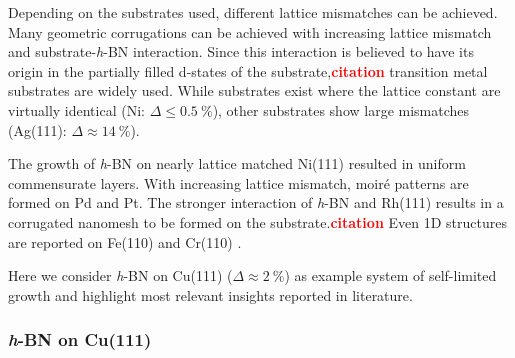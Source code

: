  Depending on the substrates used, different lattice mismatches can be achieved. Many geometric corrugations can be achieved with increasing lattice mismatch and substrate-\textit{h}-BN interaction. Since this interaction is believed to have its origin in the partially filled d-states of the substrate,\textcolor{red}{\textbf{citation}} transition metal substrates are widely used. While substrates exist where the lattice constant are virtually identical (Ni: $\Delta \leq \SI{0.5}{\percent}$), other substrates show large mismatches (Ag(111): $\Delta \approx \SI{14}{\percent}$).

The growth of \textit{h}-BN on nearly lattice matched Ni(111) resulted in uniform commensurate layers. With increasing lattice mismatch, moir\'e patterns are formed on Pd and Pt. The stronger interaction of \textit{h}-BN and Rh(111) results in a corrugated nanomesh to be formed on the substrate.\textcolor{red}{\textbf{citation}} Even 1D structures are reported on Fe(110) \cite{vinogradov_one-dimensional_2012} and Cr(110) \cite{muller_one-dimensional_2008}. 

Here we consider \textit{h}-BN on Cu(111) ($\Delta \approx \SI{2}{\percent}$) as example system of self-limited growth and highlight most relevant insights reported in literature.\cite{joshi_boron_2012, schwarz_corrugation_2017, auwarter_hexagonal_2018}

\subsubsection{\textit{h}-BN on Cu(111)}
%	

